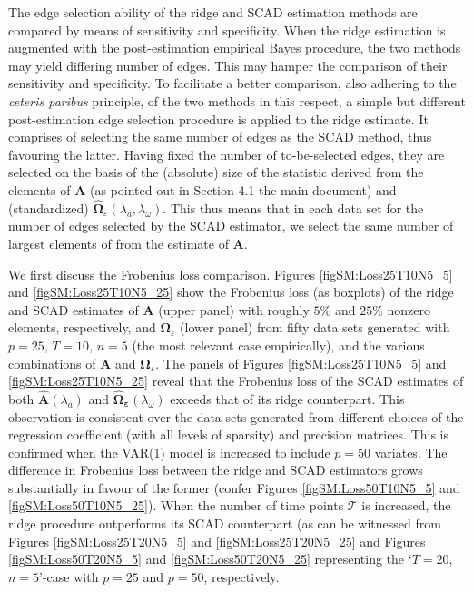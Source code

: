 \documentclass[a4paper]{article}
\begin{document}
The edge selection ability of the ridge and SCAD estimation methods are compared by means of sensitivity and specificity. When the ridge estimation is augmented with the post-estimation empirical Bayes procedure, the two methods may yield differing number of edges. This may hamper the comparison of their sensitivity and specificity. To facilitate a better comparison, also adhering to the \textit{ceteris paribus} principle, of the two methods in this respect, a simple but different post-estimation edge selection procedure is applied to the ridge estimate. It comprises of selecting the same number of edges as the SCAD method, thus favouring the latter. Having fixed the number of to-be-selected edges, they are selected on the basis of the (absolute) size of the statistic derived from the elements of $\mathbf{A}$ (as pointed out in Section 4.1 the main document) and (standardized) $\widehat{\mathbf{\Omega}}_{\varepsilon}(\lambda_a, \lambda_{\omega})$. This thus means that in each data set for the number of edges selected by the SCAD estimator, we select the same number of largest elements of from the estimate of $\mathbf{A}$.

We first discuss the Frobenius loss comparison. Figures \ref{figSM:Loss25T10N5_5} and \ref{figSM:Loss25T10N5_25} show the Frobenius loss (as boxplots) of the ridge and SCAD estimates of $\mathbf{A}$ (upper panel) with roughly $5\%$ and $25\%$ nonzero elements, respectively, and $\mathbf{\Omega}_{\varepsilon}$ (lower panel) from fifty data sets generated with $p=25$, $T=10$, $n=5$ (the most relevant case empirically), and the various combinations of $\mathbf{A}$ and $\mathbf{\Omega}_{\varepsilon}$. The panels of Figures \ref{figSM:Loss25T10N5_5}  and \ref{figSM:Loss25T10N5_25} reveal that the Frobenius loss of the SCAD estimates of both  $\mathbf{\hat{A}}(\lambda_a)$ and  $\mathbf{\hat{\Omega}_{\varepsilon}}(\lambda_{\omega})$ exceeds that of its ridge counterpart. This observation is consistent over the data sets generated from different choices of the regression coefficient (with all levels of sparsity) and precision matrices. This is confirmed when the VAR(1) model is increased to include $p=50$ variates. The difference in Frobenius loss between the ridge and SCAD estimators grows substantially in favour of the former (confer Figures \ref{figSM:Loss50T10N5_5} and \ref{figSM:Loss50T10N5_25}). When the number of time points $\mathcal{T}$ is increased, the ridge procedure outperforms its SCAD counterpart (as can be witnessed from Figures \ref{figSM:Loss25T20N5_5} and \ref{figSM:Loss25T20N5_25} and Figures \ref{figSM:Loss50T20N5_5} and \ref{figSM:Loss50T20N5_25} representing the `$T=20$, $n=5$'-case with $p=25$ and $p=50$, respectively. 
\end{document}
